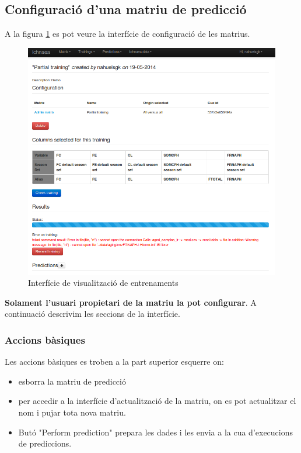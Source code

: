 \subsection{Configuració d'una matriu de predicció}
A la figura \ref{fig:view_training_pending} es pot veure la interfície de configuració de les matrius.
\begin{figure}[h!]
  \centering
  \includegraphics[scale=0.5]{img/userguide/view_training_pending.png}
  \caption{Interfície de visualització de entrenaments}
  \label{fig:view_training_pending}
\end{figure}
\textbf{Solament l'usuari propietari de la matriu la pot configurar}. A continuació descrivim les seccions de la interfície.

\subsubsection{Accions bàsiques}
Les accions bàsiques es troben a la part superior esquerre on:
\begin{itemize}
\item \iconremove esborra la matriu de predicció
\item \iconupdate per accedir a la interfície d'actualització de la matriu, on es pot actualitzar el nom i pujar tota nova matriu.
\item But\'{o} "Perform prediction" prepara les dades i les envia a la cua d'execucions de prediccions.
\end{itemize}

